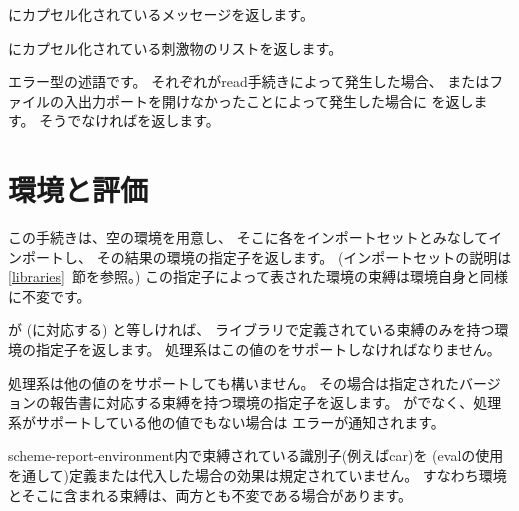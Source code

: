 \begin{entry}{%
}

にカプセル化されているメッセージを返します。

\end{entry}

\begin{entry}{%
}

にカプセル化されている刺激物のリストを返します。

\end{entry}

\begin{entry}{%
}

エラー型の述語です。
それぞれが{\cf read}手続きによって発生した場合、
またはファイルの入出力ポートを開けなかったことによって発生した場合に
\schtrue{}を返します。
そうでなければ\schfalse{}を返します。

\end{entry}

\section{環境と評価}

\begin{entry}{%
}
\label{environments}

この手続きは、空の環境を用意し、
そこに各をインポートセットとみなしてインポートし、
その結果の環境の指定子を返します。
(インポートセットの説明は\ref{libraries}~節を参照。)
この指定子によって表された環境の束縛は環境自身と同様に不変です。

\end{entry}

\begin{entry}{%
}

が{} (\rfivers{}に対応する) と等しければ、
\rfivers{}ライブラリで定義されている束縛のみを持つ環境の指定子を返します。
処理系はこの値のをサポートしなければなりません。

処理系は他の値のをサポートしても構いません。
その場合は指定されたバージョンの報告書に対応する束縛を持つ環境の指定子を返します。
が{}でなく、処理系がサポートしている他の値でもない場合は
エラーが通知されます。

{\cf scheme-report-environment}内で束縛されている識別子(例えば{\cf car})を
({\cf eval}の使用を通して)定義または代入した場合の効果は規定されていません。
すなわち環境とそこに含まれる束縛は、両方とも不変である場合があります。

\end{entry}

